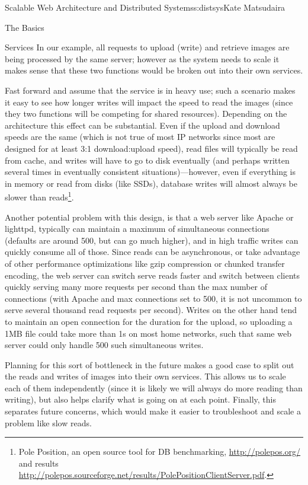 \begin{aosachapter}{Scalable Web Architecture and Distributed Systems}{s:distsys}{Kate Matsudaira}
\begin{aosasect1}{The Basics}
\begin{aosasect2}{Services}
In our example, all requests to upload (write) and retrieve images are
being processed by the same server; however as the system needs to
scale it makes sense that these two functions would be broken out into
their own services.

Fast forward and assume that the service is in heavy use; such a
scenario makes it easy to see how longer writes will impact the speed
to read the images (since they two functions will be competing for
shared resources). Depending on the architecture this effect can be
substantial. Even if the upload and download speeds are the same
(which is not true of most IP networks since most are designed for at
least 3:1 download:upload speed), read files will typically be read
from cache, and writes will have to go to disk eventually (and perhaps
written several times in eventually consistent situations)---however,
even if everything is in memory or read from disks (like SSDs),
database writes will almost always be slower than reads\footnote{Pole
  Position, an open source tool for DB benchmarking,
  \url{http://polepos.org/} and results
  \url{http://polepos.sourceforge.net/results/PolePositionClientServer.pdf}.}.

Another potential problem with this design, is that a web server like
Apache or lighttpd, typically can maintain a maximum of simultaneous
connections (defaults are around 500, but can go much higher), and in
high traffic writes can quickly consume all of those. Since reads can
be asynchronous, or take advantage of other performance optimizations
like gzip compression or chunked transfer encoding, the web server can
switch serve reads faster and switch between clients quickly serving
many more requests per second than the max number of connections (with
Apache and max connections set to 500, it is not uncommon to serve
several thousand read requests per second). Writes on the other hand
tend to maintain an open connection for the duration for the upload,
so uploading a 1MB file could take more than 1s on most home networks,
such that same web server could only handle 500 such simultaneous
writes.

Planning for this sort of bottleneck in the future makes a good case
to split out the reads and writes of images into their own
services. This allows us to scale each of them independently (since it
is likely we will always do more reading than writing), but also helps
clarify what is going on at each point. Finally, this separates future
concerns, which would make it easier to troubleshoot and scale a
problem like slow reads.


\end{aosasect2}
\end{aosasect1}
\end{aosachapter}

